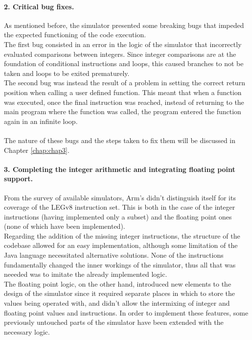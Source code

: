 \paragraph{2. Critical bug fixes.}
As mentioned before, the simulator presented some breaking bugs that impeded the expected functioning of the code execution.\\
The first bug consisted in an error in the logic of the simulator that incorrectly evaluated comparisons between integers. Since integer comparisons are at the foundation of conditional instructions and loops, this caused branches to not be taken and loops to be exited prematurely.\\
The second bug was instead the result of a problem in setting the correct return position when calling a user defined function. This meant that when a function was executed, once the final instruction was reached, instead of returning to the main program where the function was called, the program entered the function again in an infinite loop.

\paragraph{}
The nature of these bugs and the steps taken to fix them will be discussed in Chapter \ref{chap:chap3}.

\paragraph{3. Completing the integer arithmetic and integrating floating point support.}
From the survey of available simulators, Arm's didn't distinguish itself for its coverage of the LEGv8 instruction set. This is both in the case of the integer instructions (having implemented only a subset) and the floating point ones (none of which have been implemented).\\
Regarding the addition of the missing integer instructions, the structure of the codebase allowed for an easy implementation, although some limitation of the Java language necessitated alternative solutions. None of the instructions fundamentally changed the inner workings of the simulator, thus all that was neeeded was to imitate the already implemented logic.\\
The floating point logic, on the other hand, introduced new elements to the design of the simulator since it required separate places in which to store the values being operated with, and didn't allow the intermixing of integer and floating point values and instructions. In order to implement these features, some previously untouched parts of the simulator have been extended with the necessary logic.

